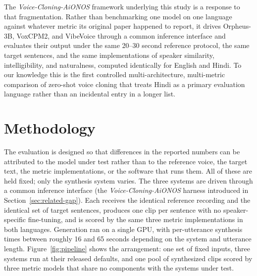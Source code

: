 \documentclass[conference]{IEEEtran}
\begin{document}
The \textit{Voice-Cloning-AiONOS} framework underlying this study is a
response to that fragmentation. Rather than benchmarking one model on one
language against whatever metric its original paper happened to report, it
drives Orpheus-3B, VoxCPM2, and VibeVoice through a common inference
interface and evaluates their output under the same 20--30 second reference
protocol, the same target sentences, and the same implementations of speaker
similarity, intelligibility, and naturalness, computed identically for
English and Hindi. To our knowledge this is the first controlled
multi-architecture, multi-metric comparison of zero-shot voice cloning that
treats Hindi as a primary evaluation language rather than an incidental entry
in a longer list.

\section{Methodology}
\label{sec:methodology}

The evaluation is designed so that differences in the reported numbers can be
attributed to the model under test rather than to the reference voice, the
target text, the metric implementations, or the software that runs them. All
of these are held fixed; only the synthesis system varies. The three systems
are driven through a common inference interface (the
\textit{Voice-Cloning-AiONOS} harness introduced in
Section~\ref{sec:related-gap}). Each receives the identical reference
recording and the identical set of target sentences, produces one clip per
sentence with no speaker-specific fine-tuning, and is scored by the same
three metric implementations in both languages. Generation ran on a single
GPU, with per-utterance synthesis times between roughly 16 and 65 seconds
depending on the system and utterance length. Figure~\ref{fig:pipeline} shows
the arrangement: one set of fixed inputs, three systems run at their released
defaults, and one pool of synthesized clips scored by three metric models
that share no components with the systems under test.
\end{document}
